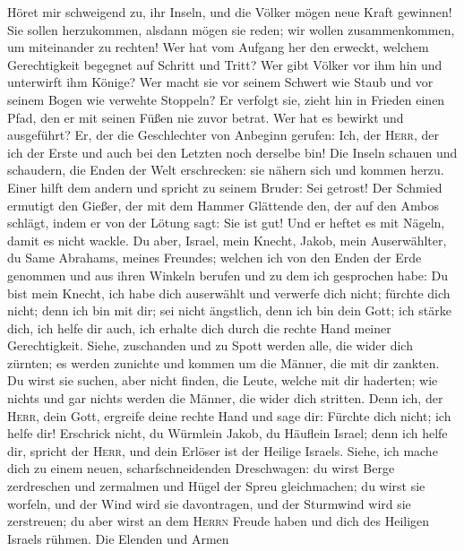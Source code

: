  Höret mir schweigend zu, ihr Inseln, und die Völker mögen
neue Kraft gewinnen! Sie sollen herzukommen, alsdann mögen sie reden;
wir wollen zusammenkommen, um miteinander zu rechten!  Wer
hat vom Aufgang her den erweckt, welchem Gerechtigkeit begegnet auf
Schritt und Tritt? Wer gibt Völker vor ihm hin und unterwirft ihm
Könige? Wer macht sie vor seinem Schwert wie Staub und vor seinem Bogen
wie verwehte Stoppeln?  Er verfolgt sie, zieht hin in
Frieden einen Pfad, den er mit seinen Füßen nie zuvor betrat.
 Wer hat es bewirkt und ausgeführt? Er, der die
Geschlechter von Anbeginn gerufen: Ich, der \textsc{Herr}, der ich der
Erste und auch bei den Letzten noch derselbe bin!  Die
Inseln schauen und schaudern, die Enden der Welt erschrecken: sie nähern
sich und kommen herzu.  Einer hilft dem andern und spricht
zu seinem Bruder: Sei getrost!  Der Schmied ermutigt den
Gießer, der mit dem Hammer Glättende den, der auf den Ambos schlägt,
indem er von der Lötung sagt: Sie ist gut! Und er heftet es mit Nägeln,
damit es nicht wackle.  Du aber, Israel, mein Knecht,
Jakob, mein Auserwählter, du Same Abrahams, meines Freundes;
 welchen ich von den Enden der Erde genommen und aus ihren
Winkeln berufen und zu dem ich gesprochen habe: Du bist mein Knecht, ich
habe dich auserwählt und verwerfe dich nicht;  fürchte
dich nicht; denn ich bin mit dir; sei nicht ängstlich, denn ich bin dein
Gott; ich stärke dich, ich helfe dir auch, ich erhalte dich durch die
rechte Hand meiner Gerechtigkeit.  Siehe, zuschanden und
zu Spott werden alle, die wider dich zürnten; es werden zunichte und
kommen um die Männer, die mit dir zankten.  Du wirst sie
suchen, aber nicht finden, die Leute, welche mit dir haderten; wie
nichts und gar nichts werden die Männer, die wider dich stritten.
 Denn ich, der \textsc{Herr}, dein Gott, ergreife deine
rechte Hand und sage dir: Fürchte dich nicht; ich helfe dir!
 Erschrick nicht, du Würmlein Jakob, du Häuflein Israel;
denn ich helfe dir, spricht der \textsc{Herr}, und dein Erlöser ist der
Heilige Israels.  Siehe, ich mache dich zu einem neuen,
scharfschneidenden Dreschwagen: du wirst Berge zerdreschen und zermalmen
und Hügel der Spreu gleichmachen;  du wirst sie worfeln,
und der Wind wird sie davontragen, und der Sturmwind wird sie
zerstreuen; du aber wirst an dem \textsc{Herrn} Freude haben und dich
des Heiligen Israels rühmen.  Die Elenden und Armen
